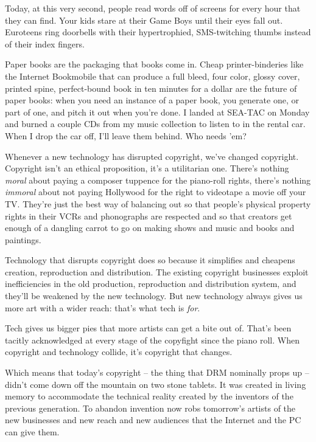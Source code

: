 Today, at this very second, people read words off of screens for
every hour that they can find. Your kids stare at their Game Boys
until their eyes fall out. Euroteens ring doorbells with their
hypertrophied, SMS-twitching thumbs instead of their index
fingers.

Paper books are the packaging that books come in. Cheap
printer-binderies like the Internet Bookmobile that can produce a
full bleed, four color, glossy cover, printed spine, perfect-bound
book in ten minutes for a dollar are the future of paper books:
when you need an instance of a paper book, you generate one, or
part of one, and pitch it out when you're done. I landed at SEA-TAC
on Monday and burned a couple CDs from my music collection to
listen to in the rental car. When I drop the car off, I'll leave
them behind. Who needs 'em?

Whenever a new technology has disrupted copyright, we've changed
copyright. Copyright isn't an ethical proposition, it's a
utilitarian one. There's nothing \emph{moral} about paying a
composer tuppence for the piano-roll rights, there's nothing
\emph{immoral} about not paying Hollywood for the right to
videotape a movie off your TV. They're just the best way of
balancing out so that people's physical property rights in their
VCRs and phonographs are respected and so that creators get enough
of a dangling carrot to go on making shows and music and books and
paintings.

Technology that disrupts copyright does so because it simplifies
and cheapens creation, reproduction and distribution. The existing
copyright businesses exploit inefficiencies in the old production,
reproduction and distribution system, and they'll be weakened by
the new technology. But new technology always gives us more art
with a wider reach: that's what tech is \emph{for}.

Tech gives us bigger pies that more artists can get a bite out of.
That's been tacitly acknowledged at every stage of the copyfight
since the piano roll. When copyright and technology collide, it's
copyright that changes.

Which means that today's copyright -- the thing that DRM nominally
props up -- didn't come down off the mountain on two stone tablets.
It was created in living memory to accommodate the technical
reality created by the inventors of the previous generation. To
abandon invention now robs tomorrow's artists of the new businesses
and new reach and new audiences that the Internet and the PC can
give them.

